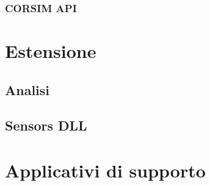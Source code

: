 \subsubsection{CORSIM API}

\section{Estensione}

\subsection{Analisi}

\subsection{Sensors DLL}

\section{Applicativi di supporto}
